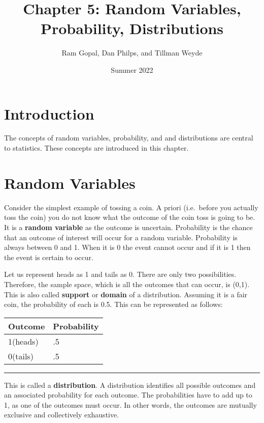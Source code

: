 \documentclass[
]{article}
\title{Chapter 5: Random Variables, Probability, Distributions}
\author{Ram Gopal, Dan Philps, and Tillman Weyde}
\date{Summer 2022}
\begin{document}
\maketitle

{
\setcounter{tocdepth}{4}
\tableofcontents
}
\hypertarget{introduction}{%
\section{Introduction}\label{introduction}}

The concepts of random variables, probability, and and distributions are
central to statistics. These concepts are introduced in this chapter.

\hypertarget{random-variables}{%
\section{Random Variables}\label{random-variables}}

Consider the simplest example of tossing a coin. A priori (i.e.~before
you actually toss the coin) you do not know what the outcome of the coin
toss is going to be. It is a \textbf{random variable} as the outcome is
uncertain. Probability is the chance that an outcome of interest will
occur for a random variable. Probability is always between 0 and 1. When
it is 0 the event cannot occur and if it is 1 then the event is certain
to occur.

Let us represent heads as 1 and tails as 0. There are only two
possibilities. Therefore, the sample space, which is all the outcomes
that can occur, is (0,1). This is also called \textbf{support} or
\textbf{domain} of a distribution. Assuming it is a fair coin, the
probability of each is 0.5. This can be represented as follows:

\begin{longtable}[]{@{}ll@{}}
\toprule()
Outcome & Probability \\
\midrule()
\endhead
1(heads) & .5 \\
0(tails) & .5 \\
\bottomrule()
\end{longtable}

\begin{center}\rule{0.5\linewidth}{0.5pt}\end{center}

This is called a \textbf{distribution}. A distribution identifies all
possible outcomes and an associated probability for each outcome. The
probabilities have to add up to 1, as one of the outcomes must occur. In
other words, the outcomes are mutually exclusive and collectively
exhaustive.
\end{document}
